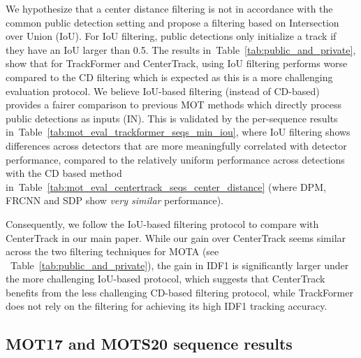 \documentclass[10pt,twocolumn,letterpaper]{article}
\newcommand{\tabref}[1]{Table~\ref{#1}}
\begin{document}
    We hypothesize that a center distance filtering is not in accordance with the common public detection setting and propose a filtering based on Intersection over Union (IoU).
For IoU filtering, public detections only initialize a track if they have an IoU larger than 0.5.
The results in~\tabref{tab:public_and_private}, show that for TrackFormer and CenterTrack, using IoU filtering performs worse compared to the CD filtering which is expected as this is a more challenging evaluation protocol.
We believe IoU-based filtering (instead of CD-based) provides a fairer comparison to previous MOT methods which directly process public detections as inputs (IN).
This is validated by the per-sequence results in~\tabref{tab:mot_eval_trackformer_seqs_min_iou}, where IoU filtering shows differences across detectors that are more meaningfully correlated with detector performance, compared to the relatively uniform performance across detections with the CD based method in~\tabref{tab:mot_eval_centertrack_seqs_center_distance} (where DPM, FRCNN and SDP show \emph{very similar} performance).


    Consequently, we follow the IoU-based filtering protocol to compare with CenterTrack in our main paper.
While our gain over CenterTrack seems similar across the two filtering techniques for MOTA (see ~\tabref{tab:public_and_private}), the gain in IDF1 is significantly larger under the more challenging IoU-based protocol, which suggests that CenterTrack benefits from the less challenging CD-based filtering protocol, while TrackFormer does not rely on the filtering for achieving its high IDF1 tracking accuracy.

\subsection{MOT17 and MOTS20 sequence results} \label{sec:results_sequences}
\end{document}
